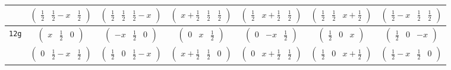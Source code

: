 \documentclass[fleqn,9pt,landscape]{jsarticle}
\begin{document}
\begin{center}
\begin{longtable}{ccccccc}
& $ \begin{pmatrix} \frac{1}{2} & \frac{1}{2} - x & \frac{1}{2} \end{pmatrix} $ & $ \begin{pmatrix} \frac{1}{2} & \frac{1}{2} & \frac{1}{2} - x \end{pmatrix} $ & $ \begin{pmatrix} x + \frac{1}{2} & \frac{1}{2} & \frac{1}{2} \end{pmatrix} $ & $ \begin{pmatrix} \frac{1}{2} & x + \frac{1}{2} & \frac{1}{2} \end{pmatrix} $ & $ \begin{pmatrix} \frac{1}{2} & \frac{1}{2} & x + \frac{1}{2} \end{pmatrix} $ & $ \begin{pmatrix} \frac{1}{2} - x & \frac{1}{2} & \frac{1}{2} \end{pmatrix} $ \\ \hline
{\tt 12g} & $ \begin{pmatrix} x & \frac{1}{2} & 0 \end{pmatrix} $ & $ \begin{pmatrix} - x & \frac{1}{2} & 0 \end{pmatrix} $ & $ \begin{pmatrix} 0 & x & \frac{1}{2} \end{pmatrix} $ & $ \begin{pmatrix} 0 & - x & \frac{1}{2} \end{pmatrix} $ & $ \begin{pmatrix} \frac{1}{2} & 0 & x \end{pmatrix} $ & $ \begin{pmatrix} \frac{1}{2} & 0 & - x \end{pmatrix} $ \\
& $ \begin{pmatrix} 0 & \frac{1}{2} - x & \frac{1}{2} \end{pmatrix} $ & $ \begin{pmatrix} \frac{1}{2} & 0 & \frac{1}{2} - x \end{pmatrix} $ & $ \begin{pmatrix} x + \frac{1}{2} & \frac{1}{2} & 0 \end{pmatrix} $ & $ \begin{pmatrix} 0 & x + \frac{1}{2} & \frac{1}{2} \end{pmatrix} $ & $ \begin{pmatrix} \frac{1}{2} & 0 & x + \frac{1}{2} \end{pmatrix} $ & $ \begin{pmatrix} \frac{1}{2} - x & \frac{1}{2} & 0 \end{pmatrix} $ \\ \hline

\end{longtable}
\end{center}
\end{document}

